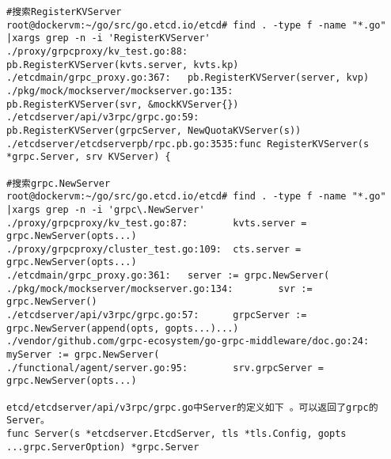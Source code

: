 
\begin{verbatim}
#搜索RegisterKVServer
root@dockervm:~/go/src/go.etcd.io/etcd# find . -type f -name "*.go" |xargs grep -n -i 'RegisterKVServer'
./proxy/grpcproxy/kv_test.go:88:        pb.RegisterKVServer(kvts.server, kvts.kp)
./etcdmain/grpc_proxy.go:367:   pb.RegisterKVServer(server, kvp)
./pkg/mock/mockserver/mockserver.go:135:        pb.RegisterKVServer(svr, &mockKVServer{})
./etcdserver/api/v3rpc/grpc.go:59:      pb.RegisterKVServer(grpcServer, NewQuotaKVServer(s))
./etcdserver/etcdserverpb/rpc.pb.go:3535:func RegisterKVServer(s *grpc.Server, srv KVServer) {

#搜索grpc.NewServer
root@dockervm:~/go/src/go.etcd.io/etcd# find . -type f -name "*.go" |xargs grep -n -i 'grpc\.NewServer'
./proxy/grpcproxy/kv_test.go:87:        kvts.server = grpc.NewServer(opts...)
./proxy/grpcproxy/cluster_test.go:109:  cts.server = grpc.NewServer(opts...)
./etcdmain/grpc_proxy.go:361:   server := grpc.NewServer(
./pkg/mock/mockserver/mockserver.go:134:        svr := grpc.NewServer()
./etcdserver/api/v3rpc/grpc.go:57:      grpcServer := grpc.NewServer(append(opts, gopts...)...)
./vendor/github.com/grpc-ecosystem/go-grpc-middleware/doc.go:24:        myServer := grpc.NewServer(
./functional/agent/server.go:95:        srv.grpcServer = grpc.NewServer(opts...)

etcd/etcdserver/api/v3rpc/grpc.go中Server的定义如下 。可以返回了grpc的Server。
func Server(s *etcdserver.EtcdServer, tls *tls.Config, gopts ...grpc.ServerOption) *grpc.Server 
\end{verbatim}

